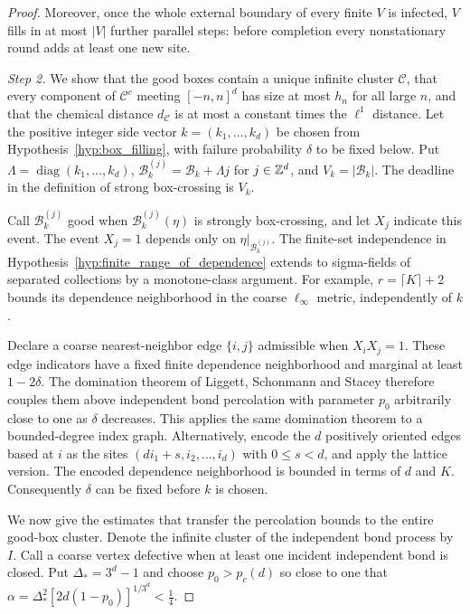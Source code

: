 \documentclass[12pt]{amsart}
\begin{document}
\begin{proof}
Moreover, once the whole external boundary of every finite $V$ is infected, $V$ fills in at most $|V|$ further parallel steps: before completion every nonstationary round adds at least one new site.

\emph{Step 2.} We show that the good boxes contain a unique infinite cluster $\mathcal C$, that every component of $\mathcal C^c$ meeting $[-n,n]^d$ has size at most $h_n$ for all large $n$, and that the chemical distance $d_{\mathcal C}$ is at most a constant times the $\ell^1$ distance. Let the positive integer side vector $k=(k_1,\ldots,k_d)$ be chosen from Hypothesis~\ref{hyp:box_filling}, with failure probability $\delta$ to be fixed below. Put $\Lambda=\operatorname{diag}(k_1,\ldots,k_d)$, $\mathcal B^{(j)}_k=\mathcal B_k+\Lambda j$ for $j\in\mathbb{Z}^d$, and $V_k=|\mathcal B_k|$. The deadline in the definition of strong box-crossing is $V_k$.

Call $\mathcal B^{(j)}_k$ good when $\mathcal B^{(j)}_k(\eta)$ is strongly box-crossing, and let $X_j$ indicate this event. The event $X_j=1$ depends only on $\eta|_{\mathcal B^{(j)}_k}$. The finite-set independence in Hypothesis~\ref{hyp:finite_range_of_dependence} extends to sigma-fields of separated collections by a monotone-class argument. For example, $r=\lceil K\rceil+2$ bounds its dependence neighborhood in the coarse $\ell_\infty$ metric, independently of $k$.

Declare a coarse nearest-neighbor edge $\{i,j\}$ admissible when $X_iX_j=1$. These edge indicators have a fixed finite dependence neighborhood and marginal at least $1-2\delta$. The domination theorem of Liggett, Schonmann and Stacey \cite{liggett1997domination} therefore couples them above independent bond percolation with parameter $p_0$ arbitrarily close to one as $\delta$ decreases. This applies the same domination theorem to a bounded-degree index graph. Alternatively, encode the $d$ positively oriented edges based at $i$ as the sites $(di_1+s,i_2,\ldots,i_d)$ with $0\leq s<d$, and apply the lattice version. The encoded dependence neighborhood is bounded in terms of $d$ and $K$. Consequently $\delta$ can be fixed before $k$ is chosen.

We now give the estimates that transfer the percolation bounds to the entire good-box cluster. Denote the infinite cluster of the independent bond process by $I$. Call a coarse vertex defective when at least one incident independent bond is closed. Put $\Delta_*=3^d-1$ and choose $p_0>p_c(d)$ so close to one that $\alpha=\Delta_*^2[2d(1-p_0)]^{1/3^d}<\frac14$.


\end{proof}
\end{document}
